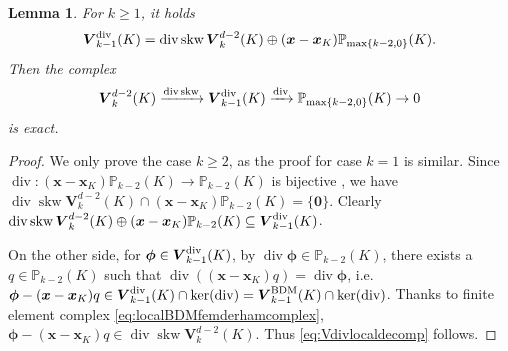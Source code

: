 \documentclass[10pt]{amsart}
\newtheorem{lemma}[theorem]{Lemma}
\renewcommand{\div}{\operatorname{div}}
\newcommand{\skw}{\operatorname{skw}}
\numberwithin{equation}{section}
\begin{document}
\begin{lemma}
For $k\geq1$,
it holds
\begin{equation}\label{eq:Vdivlocaldecomp}
\boldsymbol{V}_{k-1}^{\rm div}(K)=\div\skw \boldsymbol{V}_{k}^{d-2}(K) \oplus (\boldsymbol{x}-\boldsymbol{x}_K)\mathbb P_{\max\{k-2,0\}}(K).
\end{equation}
Then the complex
\begin{equation*}
\boldsymbol{V}_{k}^{d-2}(K)\xrightarrow{\div\skw}\boldsymbol{V}_{k-1}^{\rm div}(K)\xrightarrow{\div} \mathbb P_{\max\{k-2,0\}}(K)\to0    
\end{equation*}
is exact.
\end{lemma}
\begin{proof}
We only prove the case $k\geq2$, as the proof for case $k=1$ is similar.
Since $\div:(\boldsymbol{x}-\boldsymbol{x}_K)\mathbb P_{k-2}(K)\to\mathbb P_{k-2}(K)$ is bijective \cite[Lemma 3.1]{ChenHuang2021divdiv}, we have $\div\skw \boldsymbol{V}_{k}^{d-2}(K)\cap(\boldsymbol{x}-\boldsymbol{x}_K)\mathbb P_{k-2}(K)=\{\boldsymbol{0}\}$. Clearly $\div\skw \boldsymbol{V}_{k}^{d-2}(K) \oplus(\boldsymbol{x}-\boldsymbol{x}_K)\mathbb P_{k-2}(K)\subseteq \boldsymbol{V}_{k-1}^{\rm div}(K)$.

On the other side, for $\boldsymbol{\phi}\in \boldsymbol{V}_{k-1}^{\rm div}(K)$, by $\div\boldsymbol{\phi}\in \mathbb P_{k-2}(K)$, there exists a $q\in\mathbb P_{k-2}(K)$ such that $\div((\boldsymbol{x}-\boldsymbol{x}_K)q)=\div\boldsymbol{\phi}$, i.e. $\boldsymbol{\phi}-(\boldsymbol{x}-\boldsymbol{x}_K)q\in\boldsymbol{V}_{k-1}^{\rm div}(K)\cap\ker(\div)=\boldsymbol{V}_{k-1}^{\mathrm{BDM}}(K)\cap\ker(\div)$. Thanks to finite element complex \eqref{eq:localBDMfemderhamcomplex}, $\boldsymbol{\phi}-(\boldsymbol{x}-\boldsymbol{x}_K)q\in\div\skw \boldsymbol{V}_{k}^{d-2}(K)$. Thus \eqref{eq:Vdivlocaldecomp} follows.
\end{proof}
\end{document}
